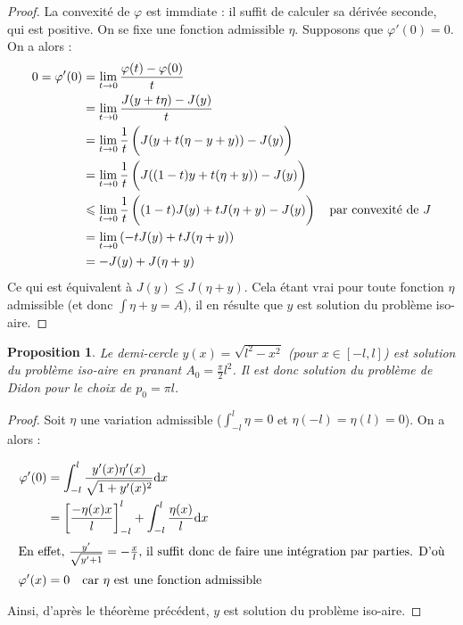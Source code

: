 \documentclass[10pt,a4paper]{article}
\renewcommand{\d}{\mathrm{d}}
\renewcommand{\phi}{\varphi}
\theoremstyle{plain}
\newtheorem{prop}[thm]{Proposition}
\theoremstyle{definition}
\begin{document}
\begin{proof}
La convexité de $\phi$ est immdiate : il suffit de calculer sa dérivée seconde, qui est positive.
On se fixe une fonction admissible $\eta$. Supposons que $\phi'(0)=0$. On a alors :
\begin{align*}
0=\phi'(0)&=\lim_{t\to 0}\dfrac{\phi(t)-\phi(0)}{t}\\
			&= \lim_{t\to0}\frac{J(y+t\eta)-J(y)}{t}\\
			&= \lim_{t\to0}\frac{1}{t}\left(\vphantom{\frac{1}{2}}J(y+t(\eta-y+y))-J(y)\right)\\
			&= \lim_{t\to0}\frac{1}{t}\left(\vphantom{\frac{1}{2}}J((1-t)y+t(\eta+y))-J(y)\right)\\
			&\leqslant\lim_{t\to0}\frac{1}{t}\left(\vphantom{\frac{1}{2}}(1-t)J(y)+tJ(\eta+y)-J(y)\right)\quad\text{par convexité de $J$}\\
			&= \lim_{t\to0}\left(-tJ(y)+tJ(\eta+y)\right)\\
			&= -J(y)+J(\eta+y)
\end{align*}
Ce qui est équivalent à $J(y)\leqslant J(\eta+y)$. Cela étant vrai pour toute fonction $\eta$ admissible (et donc $\int\eta+y=A$), il en résulte que $y$ est solution du problème iso-aire. 
\end{proof}




\begin{prop}
Le demi-cercle $y(x)=\sqrt{l^2-x^2}$ (pour $x\in[-l,l]$) est solution du problème iso-aire en pranant $A_0=\frac{\pi}{2}l^2$. Il est donc solution du problème de Didon pour le choix de $p_0=\pi l$.
\end{prop}



\begin{proof}
Soit $\eta$ une variation admissible ($\int_{-l}^l\eta=0$ et $\eta(-l)=\eta(l)=0$). On a alors :

\begin{align*}
\varphi'(0) &= \int_{-l}^l \frac{y'(x)\eta'(x)}{\sqrt{1+y'(x)^2}}\d x\\
			&= \left[\frac{-\eta(x) x}{l}\right]_{-l}^l + \int_{-l}^l\frac{\eta(x)}{l}\d x\\
\intertext{En effet, $\frac{y'}{\sqrt{y'+1}}=-\frac{x}{l}$, il suffit donc de faire une intégration par parties. D'où}
\varphi'(x)&= 0\quad\text{car }\eta\text{ est une fonction admissible}
\end{align*}

Ainsi, d'après le théorème précédent, $y$ est solution du problème iso-aire.
\end{proof}








\end{document}
